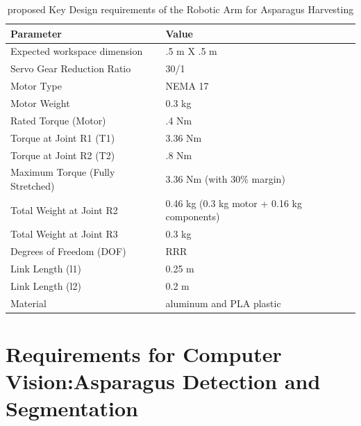 \begin{table}[h!]
\centering
\caption{proposed Key Design requirements of the Robotic Arm for Asparagus Harvesting}
\label{tab:robotic_arm_specs}
\begin{tabular}{|l|l|}
\hline
\textbf{Parameter} & \textbf{Value} \\ \hline
Expected workspace dimension & .5 m X .5 m \\ \hline
Servo Gear Reduction Ratio & 30/1 \\ \hline
Motor Type & NEMA 17 \\ \hline
Motor Weight & 0.3 kg \\ \hline
Rated Torque (Motor) & .4 Nm \\ \hline
Torque at Joint R1 (T1) & 3.36 Nm \\ \hline
Torque at Joint R2 (T2) & .8 Nm \\ \hline
Maximum Torque (Fully Stretched) & 3.36 Nm (with 30\% margin) \\ \hline
Total Weight at Joint R2 & 0.46 kg (0.3 kg motor + 0.16 kg components) \\ \hline
Total Weight at Joint R3 & 0.3 kg \\ \hline
Degrees of Freedom (DOF) & RRR \\ \hline
Link Length (l1) & 0.25 m \\ \hline
Link Length (l2) & 0.2 m \\ \hline
Material &  aluminum  and PLA plastic\\ \hline
\end{tabular}
\end{table}









\section{Requirements for Computer Vision:Asparagus Detection and Segmentation }


